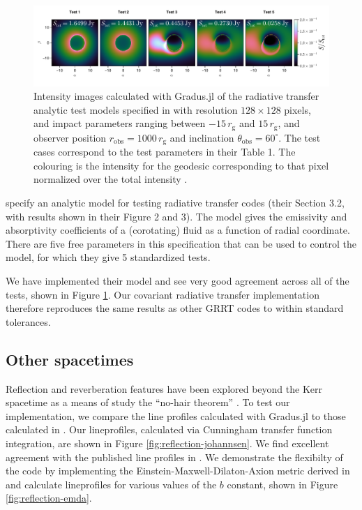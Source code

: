 \documentclass[fleqn,usenatbib]{mnras}
\newcommand{\Gradus}{Gradus.jl\xspace}
\newcommand{\rg}{r_\text{g}}
\begin{document}
\begin{figure}
    \centering
    \includegraphics[width=0.99\linewidth]{figures/radiative-transfer.gold.pdf}
    \caption{Intensity images calculated with \Gradus of the radiative transfer analytic test models specified in \citet{gold_verification_2020} with resolution $128 \times 128$ pixels, and impact parameters ranging between $-15\, \rg$ and $15\, \rg$, and observer position $r_\text{obs} = 1000\, \rg$ and inclination $\theta_\text{obs} = 60^\circ$. The test cases correspond to the test parameters in their Table 1. The colouring is the intensity for the geodesic corresponding to that pixel normalized over the total intensity .}
    \label{fig:gold-test-problems}
\end{figure}

\cite{gold_verification_2020} specify an analytic model for testing radiative
transfer codes (their Section 3.2, with results shown in their Figure 2 and 3).
The model gives the emissivity and absorptivity coefficients of a (corotating)
fluid as a function of radial coordinate. There are five free parameters in this
specification that can be used to control the model, for which they give 5
standardized tests.

We have implemented their model and see very good agreement across all of the
tests, shown in Figure \ref{fig:gold-test-problems}. Our covariant radiative
transfer implementation therefore reproduces the same results as other GRRT
codes to within standard tolerances.

\subsection{Other spacetimes}

Reflection and reverberation features have been explored beyond the Kerr
spacetime as a means of study the ``no-hair theorem'' \citep[for a review,
see][]{bambi_testing_2022}. To test our implementation, we compare the line
profiles calculated with \Gradus to those calculated in
\citet{johannsen_testing_2010}. Our lineprofiles, calculated via Cunningham
transfer function integration, are shown in Figure
\ref{fig:reflection-johannsen}. We find excellent agreement with the published
line profiles in \citet{johannsen_testing_2010}. We demonstrate the flexibilty
of the code by implementing the Einstein-Maxwell-Dilaton-Axion metric derived
in \citet{garcia_class_1995} and calculate lineprofiles for various values of
the $b$ constant, shown in Figure \ref{fig:reflection-emda}.
\end{document}
